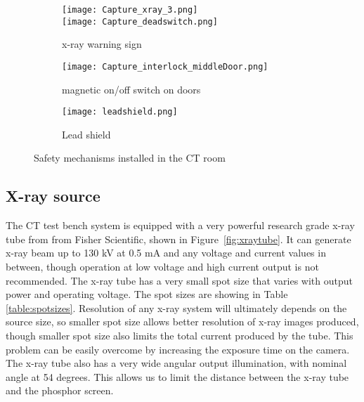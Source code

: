 \begin{figure}
	\centering
	\begin{subfigure}[b]{0.3\linewidth}
	\texttt{[image: Capture\_xray\_3.png]} \\
	\vspace{0.2cm}
	\texttt{[image: Capture\_deadswitch.png]}
	\caption{x-ray warning sign}
	\label{fig:xraywarningsign}
	\end{subfigure}
\hspace{0.2cm}
	\begin{subfigure}[b]{0.3\linewidth}
	\centering
	\texttt{[image: Capture\_interlock\_middleDoor.png]}
	\caption{magnetic on/off switch on doors}
	\label{fig:doorinterlock}
	\end{subfigure}
\hspace{0.2cm}
	\begin{subfigure}[b]{0.3\linewidth}
	\centering
	\texttt{[image: leadshield.png]}
	\caption{Lead shield}
	\label{fig:leadshield}
	\end{subfigure}
\caption{Safety mechanisms installed in the CT room}
\label{fig:safety}
\end{figure}


\subsection{X-ray source}
The CT test bench system is equipped with a very powerful research grade x-ray tube from from Fisher Scientific, shown in Figure~\ref{fig:xraytube}.  It can generate x-ray beam up to 130 kV at 0.5 mA and any voltage and current values in between, though operation at low voltage and high current output is not recommended.  The x-ray tube has a very small spot size that varies with output power and operating voltage.  The spot sizes are showing in Table \ref{table:spotsizes}.  Resolution of any x-ray system will ultimately depends on the source size, so smaller spot size allows better resolution of x-ray images produced, though smaller spot size also limits the total current produced by the tube.  This problem can be easily overcome by increasing the exposure time on the camera.  The x-ray tube also has a very wide angular output illumination, with nominal angle at 54 degrees.  This allows us to limit the distance between the x-ray tube and the phosphor screen.

